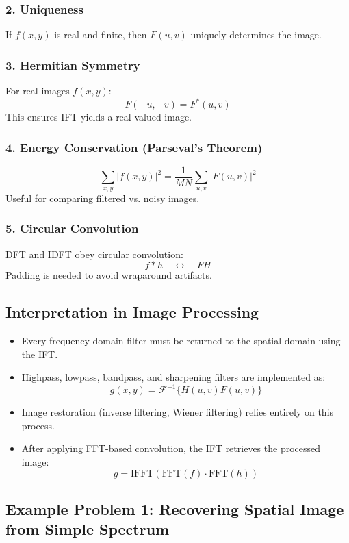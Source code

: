 \documentclass{AnantDocumentation}
\begin{document}
\subsubsection{2. Uniqueness}
If $f(x,y)$ is real and finite, then $F(u,v)$ uniquely determines the image.

\subsubsection{3. Hermitian Symmetry}
For real images $f(x,y)$:
\[
F(-u,-v) = F^*(u,v)
\]
This ensures IFT yields a real-valued image.

\subsubsection{4. Energy Conservation (Parseval’s Theorem)}
\[
\sum_{x,y} |f(x,y)|^2 = \frac{1}{MN} \sum_{u,v} |F(u,v)|^2
\]
Useful for comparing filtered vs. noisy images.

\subsubsection{5. Circular Convolution}
DFT and IDFT obey circular convolution:
\[
f * h \quad \leftrightarrow \quad FH
\]
Padding is needed to avoid wraparound artifacts.

\subsection{Interpretation in Image Processing}

\begin{itemize}
\item Every frequency-domain filter must be returned to the spatial domain using the IFT.
\item Highpass, lowpass, bandpass, and sharpening filters are implemented as:
\[
g(x,y) = \mathcal{F}^{-1}\{H(u,v)F(u,v)\}
\]
\item Image restoration (inverse filtering, Wiener filtering) relies entirely on this process.
\item After applying FFT-based convolution, the IFT retrieves the processed image:
\[
g = \text{IFFT}(\text{FFT}(f)\cdot \text{FFT}(h))
\]
\end{itemize}

\subsection{Example Problem 1: Recovering Spatial Image from Simple Spectrum}
\end{document}
